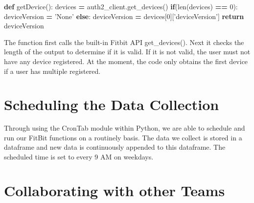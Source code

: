 \documentclass[]{book}
\newenvironment{Shaded}{\begin{snugshade}}{\end{snugshade}}
\newcommand{\KeywordTok}[1]{\textcolor[rgb]{0.13,0.29,0.53}{\textbf{#1}}}
\newcommand{\DecValTok}[1]{\textcolor[rgb]{0.00,0.00,0.81}{#1}}
\newcommand{\StringTok}[1]{\textcolor[rgb]{0.31,0.60,0.02}{#1}}
\newcommand{\ControlFlowTok}[1]{\textcolor[rgb]{0.13,0.29,0.53}{\textbf{#1}}}
\newcommand{\OperatorTok}[1]{\textcolor[rgb]{0.81,0.36,0.00}{\textbf{#1}}}
\newcommand{\BuiltInTok}[1]{#1}
\newcommand{\NormalTok}[1]{#1}
\begin{document}
\begin{Shaded}
\begin{Highlighting}[]
\KeywordTok{def}\NormalTok{ getDevice():}
\NormalTok{    devices }\OperatorTok{=}\NormalTok{ auth2_client.get_devices()}
    \ControlFlowTok{if}\NormalTok{(}\BuiltInTok{len}\NormalTok{(devices) }\OperatorTok{==} \DecValTok{0}\NormalTok{):}
\NormalTok{        deviceVersion }\OperatorTok{=} \StringTok{'None'}
    \ControlFlowTok{else}\NormalTok{:}
\NormalTok{        deviceVersion }\OperatorTok{=}\NormalTok{ devices[}\DecValTok{0}\NormalTok{][}\StringTok{'deviceVersion'}\NormalTok{]    }
    \ControlFlowTok{return}\NormalTok{ deviceVersion}
\end{Highlighting}
\end{Shaded}

The function first calls the built-in Fitbit API get\_devices(). Next it
checks the length of the output to determine if it is valid. If it is
not valid, the user must not have any device registered. At the moment,
the code only obtains the first device if a user has multiple
registered.

\section{Scheduling the Data
Collection}\label{scheduling-the-data-collection}

Through using the CronTab module within Python, we are able to schedule
and run our FitBit functions on a routinely basis. The data we collect
is stored in a dataframe and new data is continuously appended to this
dataframe. The scheduled time is set to every 9 AM on weekdays.

\section{Collaborating with other
Teams}\label{collaborating-with-other-teams}
\end{document}
